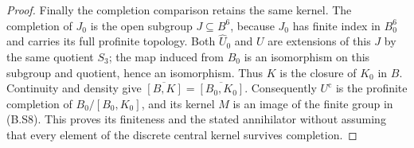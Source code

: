 \begin{proof}
Finally the completion comparison retains the same
kernel.  The completion of $J_0$ is the open subgroup
$J\subseteq B^6$, because $J_0$ has finite index in
$B_0^6$ and carries its full profinite topology.  Both
$\widehat U_0$ and $U$ are extensions of this $J$ by
the same quotient $S_3$; the map induced from $B_0$
is an isomorphism on this subgroup and quotient, hence
an isomorphism.  Thus $K$ is the closure of $K_0$ in
$B$.  Continuity and density give
$\overline{[B,K]}=\overline{[B_0,K_0]}$.  Consequently
$U^{\mathrm c}$ is the profinite completion of
$B_0/[B_0,K_0]$, and its kernel $M$ is an image of the
finite group in (B.S8).  This proves its finiteness
and the stated annihilator without assuming that
every element of the discrete central kernel survives
completion.
\end{proof}
